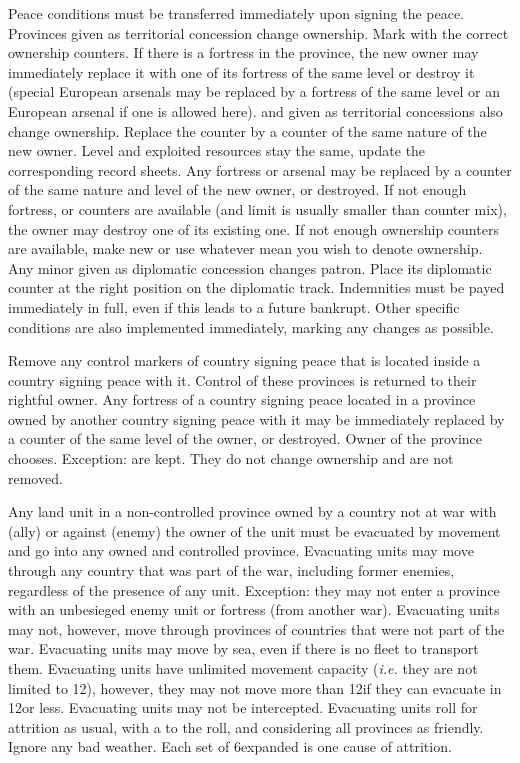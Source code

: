  Peace conditions must be transferred immediately
upon signing the peace.
\bparag Provinces given as territorial concession change ownership. Mark with
the correct ownership counters. If there is a fortress in the province, the new
owner may immediately replace it with one of its fortress of the same level or
destroy it (special European arsenals may be replaced by a fortress of the
same level or an European arsenal if one is allowed here).
\bparag \COL and \TP given as territorial concessions also change
ownership. Replace the counter by a counter of the same nature of the new
owner. Level and exploited resources stay the same, update the corresponding
record sheets. Any fortress or arsenal may be replaced by a counter of the
same nature and level of the new owner, or destroyed.
\bparag If not enough fortress, \COL or \TP counters are available (\COL and
\TP limit is usually smaller than counter mix), the owner may destroy one of
its existing one. If not enough ownership counters are available, make new or
use whatever mean you wish to denote ownership.
\bparag Any minor given as diplomatic concession changes patron. Place its
diplomatic counter at the right position on the diplomatic track.
\bparag Indemnities must be payed immediately in full, even if this leads to a
future bankrupt.
\bparag Other specific conditions are also implemented immediately, marking
any changes as possible.

 Remove any control markers of country signing peace
that is located inside a country signing peace with it. Control of these
provinces is returned to their rightful owner.
\bparag Any fortress of a country signing peace located in a province owned by
another country signing peace with it may be immediately replaced by a counter
of the same level of the owner, or destroyed. Owner of the province chooses.
\bparag Exception: \Presidios are kept. They do not change ownership and are
not removed.

\label{chPeace:Evacuation}
Any land unit in a non-controlled province owned by a country not at war with
(ally) or against (enemy) the owner of the unit must be evacuated by movement
and go into any owned and controlled province.
\bparag Evacuating units may move through any country that was part of the
war, including former enemies, regardless of the presence of any unit.
\bparag Exception: they may not enter a province with an unbesieged enemy unit
or fortress (from another war).
\bparag Evacuating units may not, however, move through provinces of countries
that were not part of the war.
\bparag Evacuating units may move by sea, even if there is no fleet to
transport them.
\bparag Evacuating units have unlimited movement capacity (\emph{i.e.} they
are not limited to 12\MP), however, they may not move more than 12\MP if they
can evacuate in 12\MP or less.
\bparag Evacuating units may not be intercepted.
\bparag Evacuating units roll for attrition as usual, with a  to the
roll, and considering all provinces as friendly. Ignore any bad weather. Each
set of 6\MP expanded is one cause of attrition.

